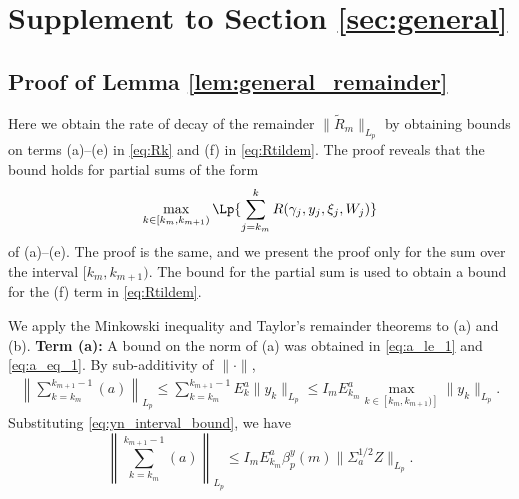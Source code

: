 \documentclass[11pt]{article}
\begin{document}
\section{Supplement to Section \ref{sec:general}}





\subsection{Proof of Lemma \ref{lem:general_remainder}}\label{app:general_remainder}
Here we obtain the rate of decay of the remainder $\lVert \tilde{R}_m\rVert_{L_p}$ by obtaining bounds on terms (a)--(e) in \eqref{eq:Rk} and (f) in \eqref{eq:Rtildem}. 
The proof reveals that the bound holds for partial sums of the form
\begin{align*}
    \max_{k \in [k_m, k_{m+1})} \Lp{\sum_{j=k_m}^{k}
    R(\gamma_j, y_j, \xi_j, W_j)
    } 
\end{align*}
of (a)--(e). 
The proof is the same, and we present the proof only for the sum over the interval $[k_m, k_{m+1})$. 
The bound for the partial sum is used to obtain a bound for the (f) term in \eqref{eq:Rtildem}. 



We apply the Minkowski inequality and Taylor's remainder theorems to (a) and (b).
\textbf{Term (a):}
A bound on the norm of (a) was obtained in \eqref{eq:a_le_1} and \eqref{eq:a_eq_1}.
By sub-additivity of $\lVert \cdot \rVert$,
\begin{align*}
    \left\lVert \sum_{k=k_m}^{k_{m+1} -1} (a) \right\rVert_{L_p}
    \leq \sum_{k=k_m}^{k_{m+1} - 1} E_k^a \lVert y_k \rVert_{L_p}
    \leq 
    I_m E_{k_m}^{a}\max_{k \in [k_m, k_{m+1})]} \lVert y_k \rVert_{L_p} 
    .
\end{align*}
Substituting \eqref{eq:yn_interval_bound}, we have
\begin{equation}\label{eq:abound}
    \left\lVert \sum_{k=k_m}^{k_{m+1} -1} (a) \right\rVert_{L_p}
    \leq 
    I_m E_{k_m}^{a}  \beta_p^y (m) \lVert \Sigma_a^{1/2} Z \rVert_{L_p} 
    .
\end{equation}
 
\end{document}
